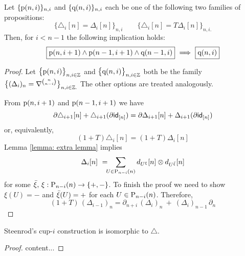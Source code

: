 %
%
%
%
%

\begin{lemma}
    Let $\{\p(n, i)\}_{n, i}$ and $\{\q(n, i)\}_{n, i}$ each be one of the following two families of propositions:
    \[ \label{proposition: uniqueness: eq1}
    \big\{ \triangle_i  [n] = \Delta_ i [n] \big\}_{n, i} \qquad
    \big\{ \triangle_i  [n] = T \Delta_ i [n] \big\}_{n, i.}
    \]
    Then, for $i < n-1$ the following implication holds:
    \[ \label{proposition: uniqueness: eq2}
    \boxed{\p(n,i+1) \wedge \p(n-1,i+1) \wedge \q(n-1,i)}\ \Longrightarrow\ \boxed{\q(n,i)}
    \]
\end{lemma}

\begin{proof}
        Let $\big\{ \p(n,i) \big\}_{n,i \in \Z}$ and $\big\{ \q(n,i) \big\}_{n,i \in \Z}$ both be the family $\big\{ (\Delta_i)_n = \nabla^{n \choose n-i} \big\}_{n,i \in \Z.}$ The other options are treated analogously.

		From $\p(n, i+1)$ and $\p(n-1, i+1)$ we have
		\[
		\partial \triangle_{i+1} [n] + \triangle_{i+1} (\partial \id_{[n]}) = \partial \Delta_{i+1} [n] + \Delta_{i+1} (\partial \id_{[n]})
		\]
		or, equivalently,
		\[
		(1+T) \triangle_{i}  [n] = (1+T) \Delta_{i}  [n]
		\]
		Lemma \ref{lemma: extra lemma} implies
		\begin{equation} \label{proposition: uniqueness: induction step: eq1}
		\Delta_{i} [n] \ = \!\!\! \sum_{U \in \P_{n-i}(n)} d_{U^{\xi}} [n] \tensor d_{U^{\barxi}} [n]
		\end{equation}
		for some $\barxi,\, \xi: \P_{n-i}(n)\to\{+,-\}$.
To finish the proof we need to show $\xi(U) = -$ and $\barxi(U) = +$
		for each $U \in \P_{n-i}(n)$.
 Therefore,
		\[
		(1+T)\,(\Delta_{i-1})_n =
		\partial_{n+i}\, (\Delta_{i})_n\ +\ (\Delta_{i})_{n-1}\, \partial_{n}
		\]
\end{proof}

\begin{proposition} \label{proposition: uniqueness}
    Steenrod's cup-$i$ construction is isomorphic to $\triangle$.
\end{proposition}

\begin{proof}
    content...
\end{proof}